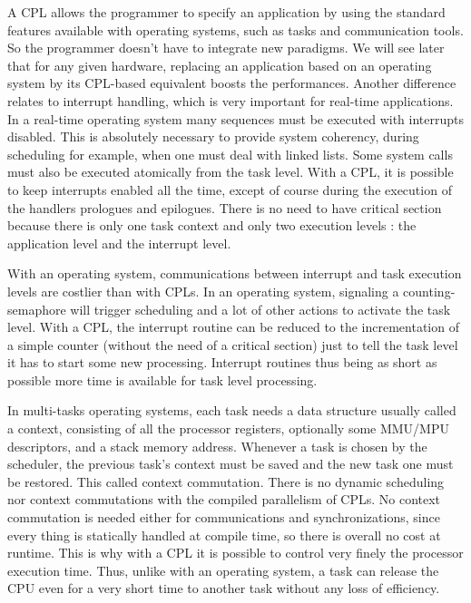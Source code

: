 \documentclass[10pt]{report}
\begin{document}
A CPL allows the programmer to specify an application by using the standard features available with operating systems, such as tasks
and communication tools. So the programmer doesn't have to integrate new paradigms. We will see later that for any given hardware, 
replacing an application based on an operating system by its CPL-based equivalent boosts the performances. Another difference
relates to interrupt handling, which is very important for real-time applications. In a real-time operating system many sequences 
must be executed with interrupts disabled. This is absolutely necessary to provide system coherency, during scheduling for example, 
when one must deal with linked lists. Some system calls must also be executed atomically from the task level. With a CPL, it is possible 
to keep interrupts enabled all the time, except of course during the execution of the handlers prologues and epilogues. There is no need 
to have critical section because there is only one task context and only two execution levels : the application level 
and the interrupt level.

With an operating system, communications between interrupt and task execution levels are costlier than with CPLs. In an operating system, 
signaling a counting-semaphore will trigger scheduling and a lot of other actions to activate the task level. With a CPL, the interrupt routine 
can be reduced to the incrementation of a simple counter (without the need of a critical section) just to tell the task level it has to start 
some new processing. Interrupt routines thus being as short as possible more time is available for task level processing.

In multi-tasks operating systems, each task needs a data structure usually called a context, consisting of all the processor
registers, optionally some MMU/MPU descriptors, and a stack memory address. Whenever a task is chosen by the scheduler, the previous
task's context must be saved and the new task one must be restored. This called context commutation. There is no dynamic scheduling 
nor context commutations with the compiled parallelism of CPLs. No context commutation is needed either for communications and synchronizations, 
since every thing is statically handled at compile time, so there is overall no cost at runtime. This is why with a CPL it is possible to control 
very finely the processor execution time. Thus, unlike with an operating system, a task can release the CPU even for a very short time to another 
task without any loss of efficiency.
\end{document}
